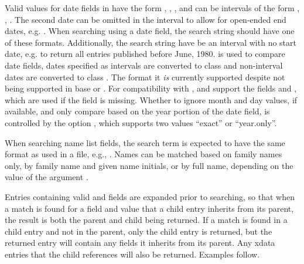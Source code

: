 \documentclass[article]{jss}\usepackage[]{graphicx}\usepackage[]{color}
\newcommand{\ourpkg}{\pkg{RefManageR}}
\begin{document}
Valid values for date fields in \Biblatex{} have the form , , , and can be intervals of the form , , .  The second date can be omitted in the interval to allow for open-ended end dates, e.g. .  When searching using a date field, the search string should have one of these formats.  Additionally, the search string have be an interval with no start date, e.g.  to return all entries published before June, 1980.   \citep{lubridate} is used to compare date fields, dates specified as intervals are converted to class  and non-interval dates are converted to class .  The format  it \emph{is} currently supported despite not being supported in base \R{} or .  For compatibility with \Bibtex{}, \Biblatex{} and \ourpkg{} support the fields  and , which are used if the  field is missing. Whether to ignore month and day values, if available, and only compare based on the year portion of the date field, is controlled by the option , which supports two values ``exact'' or ``year.only''.

When searching name list fields, the search term is expected to have the same format as used in a  file, e.g., .  Names can be matched based on family names only, by family name and given name initials, or by full name, depending on the value of the argument .  

Entries containing valid  and  fields are expanded prior to searching, so that when a match is found for a field and value that a child entry inherits from its parent, the result is both the parent and child being returned.  If a match is found in a child entry and not in the parent, only the child entry is returned, but the returned entry will contain any fields it inherits from its parent.  Any xdata entries that the child references will also be returned.  Examples follow.
\end{document}
